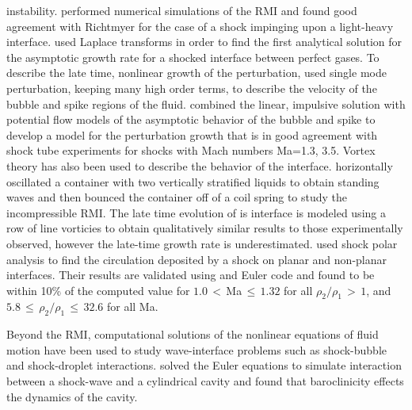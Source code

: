 instability. \cite{Meyer1972} performed numerical simulations of the
\ac{RMI} and found good agreement with Richtmyer for the case of a
shock impinging upon a light-heavy interface. \cite{Fraley1986} used
Laplace transforms in order to find the first analytical solution for
the asymptotic growth rate for a shocked interface between perfect
gases. To describe the late time, nonlinear growth of the
perturbation, \cite{Zhang1997} used single mode perturbation, keeping
many high order terms, to describe the velocity of the bubble and
spike regions of the fluid. \cite{Sadot1998} combined the linear,
impulsive solution with potential flow models of the asymptotic
behavior of the bubble and spike to develop a model for the
perturbation growth that is in good agreement with shock tube
experiments for shocks with Mach numbers Ma=1.3, 3.5. Vortex theory
has also been used to describe the behavior of the
interface. \cite{Jacobs1996} horizontally oscillated a container with
two vertically stratified liquids to obtain standing waves and then
bounced the container off of a coil spring to study the incompressible
\ac{RMI}. The late time evolution of is interface is modeled using a
row of line vorticies to obtain qualitatively similar results to those
experimentally observed, however the late-time growth rate is
underestimated. \cite{Samtaney1994} used shock polar analysis to find
the circulation deposited by a shock on planar and non-planar
interfaces. Their results are validated using and Euler code and found
to be within 10\% of the computed value for $1.0\,<\,$Ma$\,\leq\,1.32$
for all $\rho_2/\rho_1\,>\,1$, and
$5.8\,\leq\,\rho_2/\rho_1\,\leq\,32.6$ for all Ma.

Beyond the \ac{RMI}, computational solutions of the nonlinear
equations of fluid motion have been used to study wave-interface
problems such as shock-bubble and shock-droplet
interactions. \cite{Ball2000} solved the Euler equations to simulate
interaction between a shock-wave and a cylindrical cavity and found
that baroclinicity effects the dynamics of the cavity.

